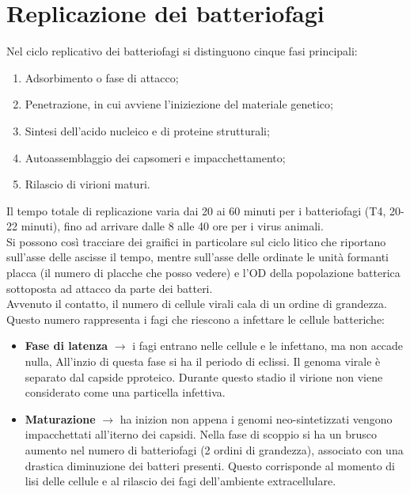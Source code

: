 \section{Replicazione dei batteriofagi}
Nel ciclo replicativo dei batteriofagi si distinguono cinque fasi principali:
\begin{enumerate}
    \item Adsorbimento o fase di attacco; 
    \item Penetrazione, in cui avviene l'iniziezione del materiale genetico; 
    \item Sintesi dell'acido nucleico e di proteine strutturali; 
    \item Autoassemblaggio dei capsomeri e impacchettamento; 
    \item Rilascio di virioni maturi. 
\end{enumerate}
Il tempo totale di replicazione varia dai 20 ai 60 minuti per i batteriofagi (T4, 20-22 minuti), fino ad arrivare dalle 8 alle 40 ore per i virus animali. 
\\Si possono così tracciare dei graifici in particolare sul ciclo litico che riportano sull'asse delle ascisse il tempo, mentre sull'asse delle ordinate le unità formanti placca (il numero di placche che posso vedere) e l'OD della popolazione batterica sottoposta ad attacco da parte dei batteri.
\\Avvenuto il contatto, il numero di cellule virali cala di un ordine di grandezza. Questo numero rappresenta i fagi che riescono a infettare le cellule batteriche: 
\begin{itemize}
    \item \textbf{Fase di latenza} $\xrightarrow{}$ i fagi entrano nelle cellule e le infettano, ma non accade nulla, All'inzio di questa fase si ha il periodo di eclissi. Il genoma virale è separato dal capside pproteico. Durante questo stadio il virione non viene considerato come una particella infettiva.
    \item \textbf{Maturazione} $\xrightarrow{}$ ha inizion non appena i genomi neo-sintetizzati vengono impacchettati all'iterno dei capsidi. Nella fase di scoppio si ha un brusco aumento nel numero di batteriofagi (2 ordini di grandezza), associato con una drastica diminuzione dei batteri presenti. Questo corrisponde al momento di lisi delle cellule e al rilascio dei fagi dell'ambiente extracellulare.
\end{itemize}
